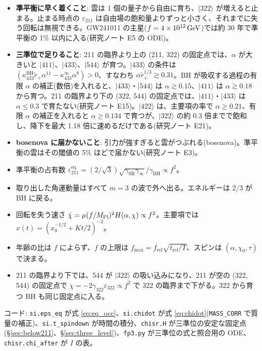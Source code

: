 \begin{itemize}
\item \textbf{準平衡に早く着くこと}: 雲は 1 個の量子から自由に育ち、$|322\rangle$ が増えると止まる。止まる時点の $\varepsilon_{211}$ は自由場の飽和量よりずっと小さく、それまでに失う回転は無視できる。GW241011 の主星($f=4\times10^{12}\,\mathrm{GeV}$)では約 30 年で準平衡の 1\% 以内に入る(研究ノート E5 の ODE)。
\item \textbf{三準位で足りること}: 211 の臨界より上の (211, 322) の固定点では、$\alpha$ が大きいと $|411\rangle$、$|433\rangle$、$|544\rangle$ が育つ。$|433\rangle$ の条件は $(\kappa_{433}^\mathrm{BH}\tilde r_+\alpha^{11}-\kappa_{433}^{\infty}\alpha^8)>0$、すなわち $\alpha\tilde r_+^{1/3}\gtrsim0.31$。BH が吸収する過程の有限 $\alpha$ の補正(数倍)を入れると、$|433\rangle$・$|544\rangle$ は $\alpha\gtrsim0.15$、$|411\rangle$ は $\alpha\gtrsim0.18$ から育つ。211 の臨界より下の (322, 544) の固定点では、$|411\rangle$・$|433\rangle$ は $\alpha\le0.3$ で育たない(研究ノート E15)。$|422\rangle$ は、主要項の率で $\alpha\ge0.21$、有限 $\alpha$ の補正を入れると $\alpha\ge0.134$ で育つが、$|322\rangle$ の約 0.3 倍までで飽和し、降下を最大 1.18 倍に速めるだけである(研究ノート E21)。
\item \textbf{bosenova に届かないこと}: 引力が強すぎると雲がつぶれる(bosenova)。準平衡の雲はその閾値の 5\% ほどで届かない(研究ノート E3)。
\end{itemize}

\begin{summary}
\begin{itemize}
\item 準平衡の占有数 $\varepsilon_{211}^\mathrm{eq}=(2/\sqrt3)\sqrt{\gamma_\mathrm{SR}\gamma_\infty}/\gamma_\mathrm{BH}\propto f^2$。
\item 取り出した角運動量はすべて $m=3$ の波で外へ出る。エネルギーは 2/3 が BH に戻る。
\item 回転を失う速さ $\dot\chi=\mu(f/M_\mathrm{Pl})^2H(\alpha,\chi)\propto f^2$。主要項では $x(t)=(x_0^{-1/2}+Kt/2)^{-2}$。
\item 年齢の比は $f$ によらず、$f$ の上限は $f_\mathrm{max}=f_\mathrm{ref}\sqrt{t_\mathrm{ref}/T}$、スピンは $(\alpha,\chi_0,\tau)$ で決まる。
\item 211 の臨界より下では、544 が $|322\rangle$ の吸い込みになり、211 が空の (322, 544) の固定点で $\dot\chi=-2\gamma_{322}\varepsilon_{322}\propto f^2$ で 322 の臨界まで下がる。322 から育つ BH も同じ固定点に入る。
\end{itemize}
\end{summary}

\begin{tocode}
コード: \texttt{si.eps\_eq} が式 \eqref{eq:eq_occ}、\texttt{si.chidot} が式 \eqref{eq:chidot}(\texttt{MASS\_CORR} で質量の補正)、\texttt{si.t\_spindown} が時間の積分、\texttt{chisr.H} が三準位の安定な固定点(\S\ref{sec:below211}、\S\ref{sec:three_level})、\texttt{fp3.py} が三準位の式と照合用の ODE、\texttt{chisr.chi\_after} が $I$ の表。
\end{tocode}
